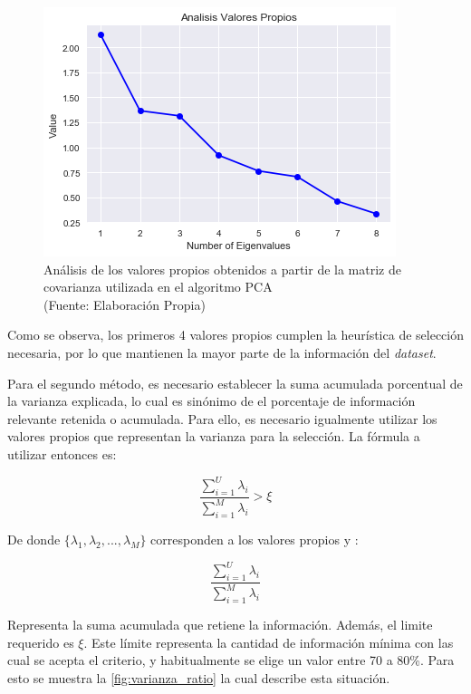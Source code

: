 \begin{figure}[ht!]
\centering
\includegraphics[width=.6\textwidth]{figures/eigenvalues.png}
\caption[Análisis de los valores propios obtenidos a partir de la matriz de covarianza]{Análisis de los valores propios obtenidos a partir de la matriz de covarianza utilizada en el algoritmo PCA  \\
{\scriptsize (Fuente: Elaboración Propia)}}
\label{fig:analisis-vp}
\end{figure}

Como se observa, los primeros 4 valores propios cumplen la heurística de selección necesaria, por lo que mantienen la mayor parte de la información del \textit{dataset}.

Para el segundo método, es necesario establecer la suma acumulada porcentual de la varianza explicada, lo cual es sinónimo de el porcentaje de información relevante retenida o acumulada. Para ello, es necesario igualmente utilizar los valores propios que representan la varianza para la selección. La fórmula a utilizar entonces es:

\begin{equation} \frac{\sum_{i=1}^{U}\lambda_{i}}{\sum_{i=1}^{M}\lambda_{i}}  > \xi
\end{equation}

De donde $\{ \lambda_{1}, \lambda_{2}, ..., \lambda_{M}\}$ corresponden a los valores propios y :

\begin{equation}
\frac{\sum_{i=1}^{U}\lambda_{i}}{\sum_{i=1}^{M}\lambda_{i}}
\end{equation}

Representa la suma acumulada que retiene la información. Además, el limite requerido es $\xi$. Este límite representa la cantidad de información mínima con las cual se acepta el criterio, y habitualmente se elige un valor entre 70 a 80\%. Para esto se muestra la \autoref{fig:varianza_ratio} la cual describe esta situación.

